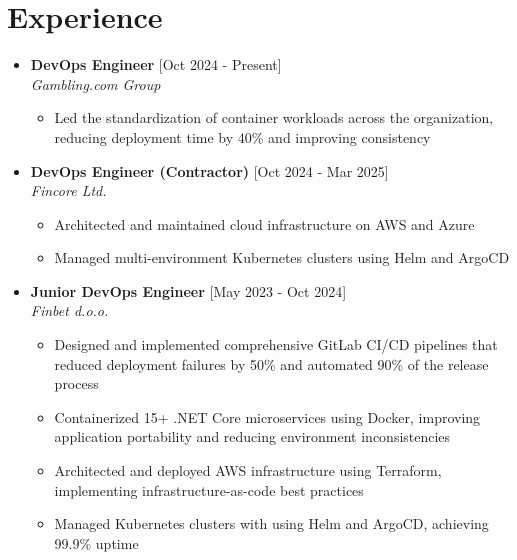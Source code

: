 \documentclass[12pt,a4paper]{moderncv}
\begin{document}
\makecvtitle

\vspace{-0.5em}
\section{Experience}

\begin{itemize}
	\item \textbf{DevOps Engineer} \hfill [Oct 2024 - Present]\\
	\textit{Gambling.com Group}

	\begin{itemize}
		\vspace{-0.75em}
		\setlength\itemsep{0.1em}
		\item Led the standardization of container workloads across the organization, reducing deployment time by 40\% and improving consistency
	\end{itemize}

	\item \textbf{DevOps Engineer (Contractor)} \hfill [Oct 2024 - Mar 2025]\\
	\textit{Fincore Ltd.}

	\begin{itemize}
		\vspace{-0.75em}
		\setlength\itemsep{0.1em}
		\item Architected and maintained cloud infrastructure on AWS and Azure
		\item Managed multi-environment Kubernetes clusters using Helm and ArgoCD
	\end{itemize}

	\item \textbf{Junior DevOps Engineer} \hfill [May 2023 - Oct 2024]\\
	\textit{Finbet d.o.o.}

	\begin{itemize}
		\vspace{-0.75em}
		\setlength\itemsep{0.1em}
		\item Designed and implemented comprehensive GitLab CI/CD pipelines that reduced deployment failures by 50\% and automated 90\% of the release process
		\item Containerized 15+ .NET Core microservices using Docker, improving application portability and reducing environment inconsistencies
		\item Architected and deployed AWS infrastructure using Terraform, implementing infrastructure-as-code best practices
		\item Managed Kubernetes clusters with using Helm and ArgoCD, achieving 99.9\% uptime
	\end{itemize}

\end{itemize}	
\end{document}
